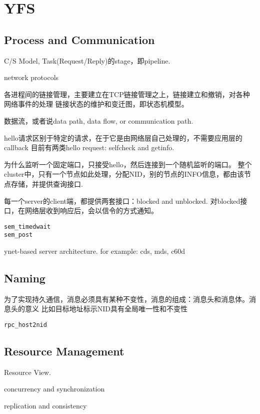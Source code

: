 \section{YFS}

\subsection{Process and Communication}
C/S Model, Task(Request/Reply)的stage，即pipeline. 

network protocols

各进程间的链接管理，主要建立在TCP链接管理之上，链接建立和撤销，对各种网络事件的处理
链接状态的维护和变迁图，即状态机模型。

数据流，或者说data path, data flow, or communication path. 

hello请求区别于特定的请求，在于它是由网络层自己处理的，不需要应用层的callback
目前有两类hello request: selfcheck and getinfo.

为什么监听一个固定端口，只接受hello，然后连接到一个随机监听的端口。
整个cluster中，只有一个节点如此处理，分配NID，别的节点的INFO信息，都由该节点存储，并提供查询接口.

每一个server的client端，都提供两套接口：blocked and unblocked. 对blocked接口，在网络层收到响应后，会以信令的方式通知。
\begin{verbatim}
sem_timedwait
sem_post
\end{verbatim}

ynet-based server architecture. for example: cds, mds, c60d

\subsection{Naming}

为了实现持久通信，消息必须具有某种不变性，消息的组成：消息头和消息体。消息头的意义
比如目标地址标示NID具有全局唯一性和不变性

\begin{verbatim}
rpc_host2nid
\end{verbatim}

\subsection{Resource Management}
Resource View.

concurrency and synchronization

replication and consistency



